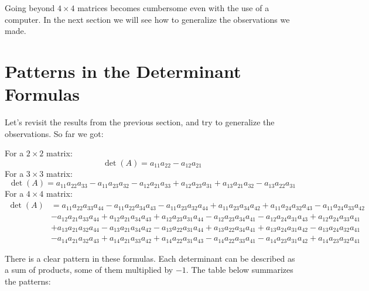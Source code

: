 \documentclass[12pt]{article}
\begin{document}
Going beyond $4\times4$ matrices becomes cumbersome even with the use of a computer. In the next section we will see how to generalize the observations we made.

\section{Patterns in the Determinant Formulas}

Let's revisit the results from the previous section, and try to generalize the observations. So far we got:

For a $2\times 2$ matrix:
\[
\det(A)=a_{11} a_{22} - a_{12} a_{21}
\]
For a $3\times 3$ matrix:
\[
\det(A)=a_{11} a_{22} a_{33} - a_{11} a_{23} a_{32} - a_{12} a_{21} a_{33} + a_{12} a_{23} a_{31} + a_{13} a_{21} a_{32} - a_{13} a_{22} a_{31}
\]
For a $4\times 4$ matrix:
\begin{align*}
\det(A)&=
a_{11} a_{22} a_{33} a_{44} - a_{11} a_{22} a_{34} a_{43} - a_{11} a_{23} a_{32} a_{44} + a_{11} a_{23} a_{34} a_{42} + a_{11} a_{24} a_{32} a_{43} - a_{11} a_{24} a_{33} a_{42}\\
&- a_{12} a_{21} a_{33} a_{44} + a_{12} a_{21} a_{34} a_{43} + a_{12} a_{23} a_{31} a_{44} - a_{12} a_{23} a_{34} a_{41} - a_{12} a_{24} a_{31} a_{43} + a_{12} a_{24} a_{33} a_{41}\\
& + a_{13} a_{21} a_{32} a_{44} - a_{13} a_{21} a_{34} a_{42} - a_{13} a_{22} a_{31} a_{44} + a_{13} a_{22} a_{34} a_{41} + a_{13} a_{24} a_{31} a_{42} - a_{13} a_{24} a_{32} a_{41}\\
& - a_{14} a_{21} a_{32} a_{43} + a_{14} a_{21} a_{33} a_{42} + a_{14} a_{22} a_{31} a_{43} - a_{14} a_{22} a_{33} a_{41} - a_{14} a_{23} a_{31} a_{42} + a_{14} a_{23} a_{32} a_{41}
\end{align*}

There is a clear pattern in these formulas. Each determinant can be described as a sum of products, some of them multiplied by $-1$. The table below summarizes the patterns:
\end{document}
